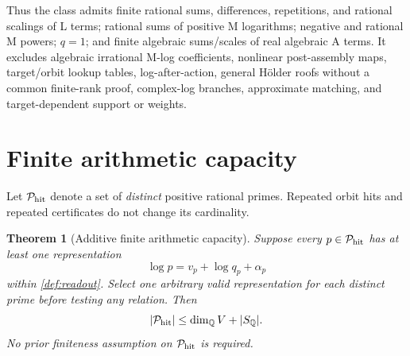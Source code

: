 \documentclass[11pt]{article}
\newtheorem{theorem}{Theorem}[section]
\theoremstyle{definition}
\theoremstyle{remark}
\begin{document}
Thus the class admits finite rational sums, differences, repetitions, and
rational scalings of L terms; rational sums of positive M logarithms; negative
and rational M powers; $q=1$; and finite algebraic sums/scales of real
algebraic A terms.  It excludes algebraic irrational M-log coefficients,
nonlinear post-assembly maps, target/orbit lookup tables, log-after-action,
general H\"older roofs without a common finite-rank proof, complex-log
branches, approximate matching, and target-dependent support or weights.

\section{Finite arithmetic capacity}
\label{sec:theorem}

Let $\mathcal P_{\mathrm{hit}}$ denote a set of \emph{distinct} positive rational primes.
Repeated orbit hits and repeated certificates do not change its cardinality.

\begin{theorem}[Additive finite arithmetic capacity]
\label{thm:capacity}
Suppose every $p\in\mathcal P_{\mathrm{hit}}$ has at least one representation
\begin{equation}
 \log p=v_p+\log q_p+\alpha_p
 \label{eq:hit}
\end{equation}
within \cref{def:readout}.  Select one arbitrary valid representation for
each distinct prime before testing any relation.  Then
\begin{equation}
 |\mathcal P_{\mathrm{hit}}|\leq \dim_{\mathbb Q} V+|S_{\mathbb Q}|.
 \label{eq:main-bound}
\end{equation}
No prior finiteness assumption on $\mathcal P_{\mathrm{hit}}$ is required.
\end{theorem}
\end{document}
